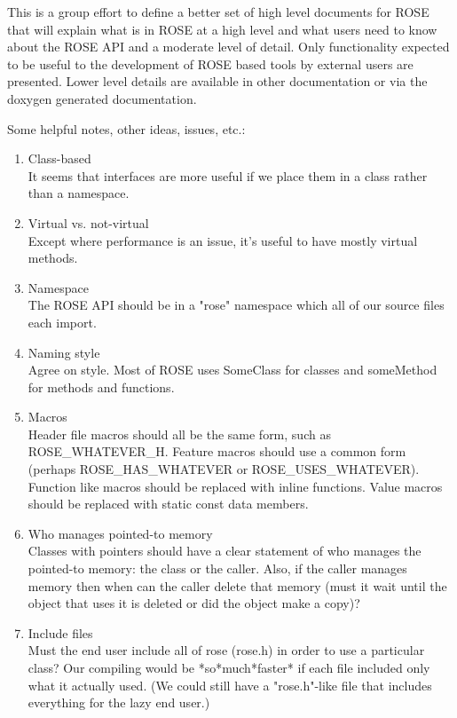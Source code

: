     This is a group effort to define a better set of high level documents for ROSE
that will explain what is in ROSE at a high level and what users need to know about the
ROSE API and a moderate level of detail.  Only functionality expected to be useful to the
development of ROSE based tools by external users are presented.  Lower level details are
available in other documentation or via the doxygen generated documentation.

Some helpful notes, other ideas, issues, etc.:
\begin{enumerate}
   \item Class-based \\
	It seems that interfaces are more useful if we place them in a
	class rather than a namespace.

   \item Virtual vs. not-virtual \\
	Except where performance is an issue, it's useful to have
	mostly virtual methods.

   \item Namespace \\
	The ROSE API should be in a "rose" namespace which all of our
	source files each import.

   \item Naming style \\
	Agree on style. Most of ROSE uses SomeClass for classes and
	someMethod for methods and functions.

   \item Macros \\
	Header file macros should all be the same form, such as
	ROSE\_WHATEVER\_H.  Feature macros should use a common form
	(perhaps ROSE\_HAS\_WHATEVER or ROSE\_USES\_WHATEVER). Function
	like macros should be replaced with inline functions. Value
	macros should be replaced with static const data members.

   \item Who manages pointed-to memory \\
	Classes with pointers should have a clear statement of who
	manages the pointed-to memory: the class or the caller. Also,
	if the caller manages memory then when can the caller delete
	that memory (must it wait until the object that uses it is
	deleted or did the object make a copy)?

   \item Include files \\
	Must the end user include all of rose (rose.h) in order to use
	a particular class?  Our compiling would be *so*much*faster*
	if each file included only what it actually used. (We could
	still have a "rose.h"-like file that includes everything for
	the lazy end user.)


\end{enumerate}

